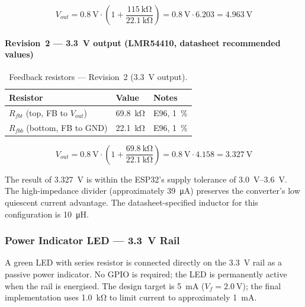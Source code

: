 \begin{equation}
  V_{out} = \SI{0.8}{\volt} \cdot \left(1 + \frac{\SI{115}{\kilo\ohm}}{\SI{22.1}{\kilo\ohm}}\right)
          = \SI{0.8}{\volt} \cdot 6.203 = \SI{4.963}{\volt}
  \label{eq:vout_rev1}
\end{equation}

\paragraph{Revision~2 — \SI{3.3}{\volt} output (LMR54410, datasheet recommended values)}

\begin{table}[H]
  \caption{Feedback resistors — Revision~2 (\SI{3.3}{\volt} output).}
  \label{tab:fb_rev2}
  \centering
  \begin{tabularx}{\textwidth}{|X|X|X|}
    \hline
    \textbf{Resistor} & \textbf{Value} & \textbf{Notes} \\ \hline \hline
    $R_{fbt}$ (top, FB to $V_{out}$) & \SI{69.8}{\kilo\ohm} & E96, \SI{1}{\percent} \\ \hline
    $R_{fbb}$ (bottom, FB to GND)    & \SI{22.1}{\kilo\ohm} & E96, \SI{1}{\percent} \\ \hline
  \end{tabularx}
\end{table}

\begin{equation}
  V_{out} = \SI{0.8}{\volt} \cdot \left(1 + \frac{\SI{69.8}{\kilo\ohm}}{\SI{22.1}{\kilo\ohm}}\right)
          = \SI{0.8}{\volt} \cdot 4.158 = \SI{3.327}{\volt}
  \label{eq:vout_rev2}
\end{equation}

The result of \SI{3.327}{\volt} is within the ESP32's supply tolerance of \SI{3.0}{\volt}--\SI{3.6}{\volt}.
The high-impedance divider (approximately \SI{39}{\micro\ampere}) preserves the converter's low quiescent current advantage.
The datasheet-specified inductor for this configuration is \SI{10}{\micro\henry}.

\subsubsection{Power Indicator \ac{LED} — \SI{3.3}{\volt} Rail}
\label{sec:power_led_3v3}

A green \ac{LED} with series resistor is connected directly on the \SI{3.3}{\volt} rail as a passive power indicator.
No \ac{GPIO} is required; the \ac{LED} is permanently active when the rail is energised.
The design target is \SI{5}{\milli\ampere} ($V_f = \SI{2.0}{\volt}$); the final implementation uses \SI{1.0}{\kilo\ohm} to limit current to approximately \SI{1}{\milli\ampere}.

